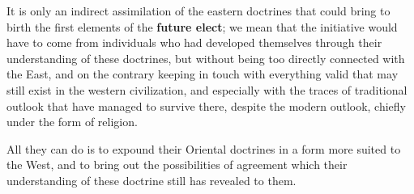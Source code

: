 \begin{quotationx}
It is only an indirect assimilation of the eastern doctrines that could bring to birth the first elements of the \textbf{future elect}; we mean that the initiative would have to come from individuals who had developed themselves through their understanding of these doctrines, but without being too directly connected with the East, and on the contrary keeping in touch with everything valid that may still exist in the western civilization, and especially with the traces of traditional outlook that have managed to survive there, despite the modern outlook, chiefly under the form of religion.

All they can do is to expound their Oriental doctrines in a form more suited to the West, and to bring out the possibilities of agreement which their understanding of these doctrine still has revealed to them.
\end{quotationx}




